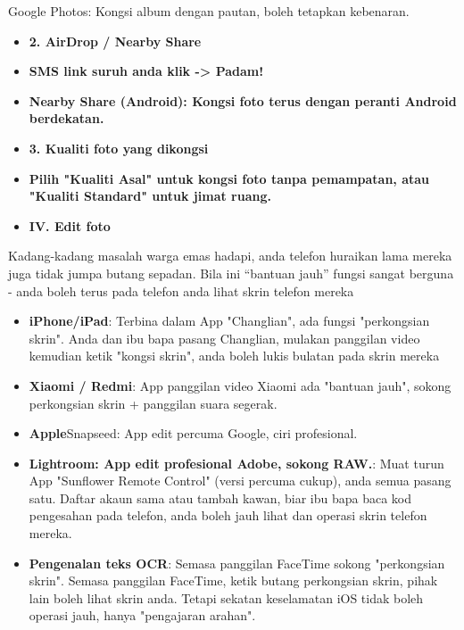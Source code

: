 \begin{tcbwarn}{Google Photos: Kongsi album dengan pautan, boleh tetapkan kebenaran.}
\begin{itemize}
  \item \textbf{2. AirDrop / Nearby Share}
  \item \textbf{SMS link suruh anda klik -> Padam!}
  \item \textbf{Nearby Share (Android): Kongsi foto terus dengan peranti Android berdekatan.}
  \item \textbf{3. Kualiti foto yang dikongsi}
  \item \textbf{Pilih "Kualiti Asal" untuk kongsi foto tanpa pemampatan, atau "Kualiti Standard" untuk jimat ruang.}
  \item \textbf{IV. Edit foto}
\end{itemize}

\end{tcbwarn}


Kadang-kadang masalah warga emas hadapi, anda telefon huraikan lama mereka juga tidak jumpa butang sepadan. Bila ini “bantuan jauh” fungsi sangat berguna - anda boleh terus pada telefon anda lihat skrin telefon mereka

\begin{itemize}
  \item \textbf{iPhone/iPad}: Terbina dalam App "Changlian", ada fungsi "perkongsian skrin". Anda dan ibu bapa pasang Changlian, mulakan panggilan video kemudian ketik "kongsi skrin", anda boleh lukis bulatan pada skrin mereka
  \item \textbf{Xiaomi / Redmi}: App panggilan video Xiaomi ada "bantuan jauh", sokong perkongsian skrin + panggilan suara segerak.
  \item \textbf{Apple}Snapseed: App edit percuma Google, ciri profesional.
  \item \textbf{Lightroom: App edit profesional Adobe, sokong RAW.}: Muat turun App "Sunflower Remote Control" (versi percuma cukup), anda semua pasang satu. Daftar akaun sama atau tambah kawan, biar ibu bapa baca kod pengesahan pada telefon, anda boleh jauh lihat dan operasi skrin telefon mereka.
  \item \textbf{Pengenalan teks OCR}: Semasa panggilan FaceTime sokong "perkongsian skrin". Semasa panggilan FaceTime, ketik butang perkongsian skrin, pihak lain boleh lihat skrin anda. Tetapi sekatan keselamatan iOS tidak boleh operasi jauh, hanya "pengajaran arahan".
\end{itemize}

